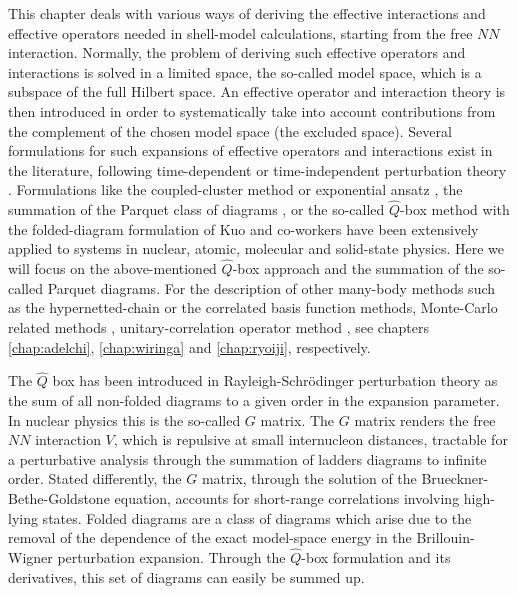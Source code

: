 This chapter deals  with various ways of deriving the effective
interactions
and effective operators needed in shell-model calculations,
starting from the free $NN$ interaction.  Normally, the problem of
deriving such effective operators and interactions is solved in a
limited space, the so-called model space, which is a subspace of the
full Hilbert space. An effective operator 
and interaction theory is
then introduced in order to systematically take into account
contributions from the complement of the chosen
model space (the excluded space). 
Several formulations for such expansions of effective
operators and interactions exist in the literature, following
time-dependent or time-independent perturbation theory
\cite{Morten:so95,Morten:brandow67,Morten:ko90,%
Morten:hko95,Morten:lm85,Morten:so84}.
Formulations like the coupled-cluster method 
or exponential ansatz
\cite{Morten:lm85,Morten:arponen97,Morten:lk72a,Morten:lk72b,%
Morten:zabolitzky74,Morten:klz78,Morten:ticcm,Morten:hm98},
the summation of the Parquet class of diagrams 
\cite{Morten:dm64,Morten:nozieres,Morten:babu,Morten:jls82,%
Morten:br86,Morten:scalapino,Morten:ym96,Morten:dya97},
or the so-called $\hat{Q}$-box method with the folded-diagram formulation of
Kuo and co-workers \cite{Morten:ko90,Morten:hko95} have been
extensively applied to systems in nuclear, atomic, molecular and
solid-state physics.  Here we will focus on the above-mentioned
$\hat{Q}$-box approach and the summation of the so-called Parquet
diagrams.  For the description of other many-body methods such as the
hypernetted-chain or the correlated basis function
\cite{Morten:adelchi98} methods, Monte-Carlo related methods
\cite{Morten:david97,Morten:vijay}, unitary-correlation operator method 
\cite{Morten:so84},   see chapters \ref{chap:adelchi}, \ref{chap:wiringa}
and \ref{chap:ryoiji}, respectively.

The $\hat{Q}$ box has been introduced in Rayleigh-Schr\"odinger
perturbation theory as the sum of all non-folded diagrams to a
given order in the expansion parameter. In nuclear physics this is the
so-called $G$ matrix.
The $G$ matrix renders the free $NN$  interaction $V$, which
is repulsive at small internucleon distances,  tractable
for a perturbative analysis through the summation of ladders diagrams
to infinite order. Stated differently, the $G$ matrix, through the
solution of the 
Brueckner-Bethe-Goldstone  equation, 
accounts for short-range correlations involving high-lying states.
Folded diagrams are a class of diagrams which arise
due to the removal of the dependence of the exact model-space energy
in the Brillouin-Wigner perturbation expansion. Through the $\hat{Q}$-box
formulation and its derivatives, this set of diagrams can easily be summed
up. 

